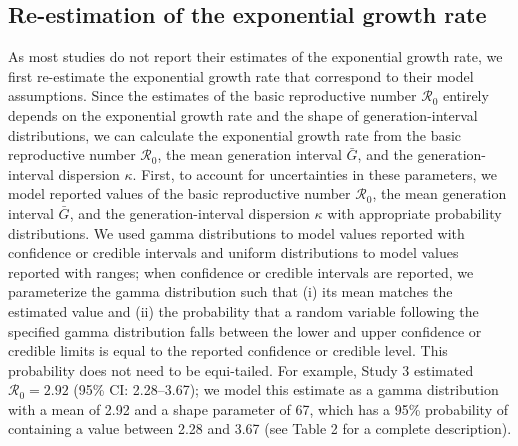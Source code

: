 \documentclass[12pt]{article}
\newcommand{\Ro}{\ensuremath{{\mathcal R}_{0}}\xspace}
\begin{document}
\subsection{Re-estimation of the exponential growth rate}

As most studies do not report their estimates of the exponential growth rate, we first re-estimate the exponential growth rate that correspond to their model assumptions.
Since the estimates of the basic reproductive number \Ro entirely depends on the exponential growth rate and the shape of generation-interval distributions, we can calculate the exponential growth rate from the basic reproductive number \Ro, the mean generation interval $\bar G$, and the generation-interval dispersion $\kappa$.
First, to account for uncertainties in these parameters, we model reported values of the basic reproductive number \Ro, the mean generation interval $\bar G$, and the generation-interval dispersion $\kappa$ with appropriate probability distributions.
We used gamma distributions to model values reported with confidence or credible intervals and uniform distributions to model values reported with ranges;
when confidence or credible intervals are reported, we parameterize the gamma distribution such that (i) its mean matches the estimated value and (ii) the probability that a random variable following the specified gamma distribution falls between the lower and upper confidence or credible limits is equal to the reported confidence or credible level. 
This probability does not need to be equi-tailed.
For example, Study 3 estimated $\Ro = 2.92$ (95\% CI: 2.28--3.67);
we model this estimate as a gamma distribution with a mean of 2.92 and a shape parameter of 67, which has a 95\% probability of containing a value between 2.28 and 3.67 (see Table 2 for a complete description).
\end{document}
